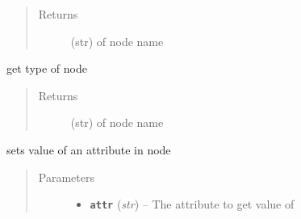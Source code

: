 \documentclass[letterpaper,10pt,english]{sphinxmanual}
\begin{document}
\begin{fulllineitems}
\begin{fulllineitems}
\begin{quote}
\begin{description}
\item[{Returns}] \leavevmode
(str) of node name

\end{description}\end{quote}

\end{fulllineitems}


\begin{fulllineitems}
\label{zBuilder.nodes:zBuilder.nodes.base.BaseNode.get_type}
get type of node
\begin{quote}\begin{description}
\item[{Returns}] \leavevmode
(str) of node name

\end{description}\end{quote}

\end{fulllineitems}


\begin{fulllineitems}
\label{zBuilder.nodes:zBuilder.nodes.base.BaseNode.print_}
\end{fulllineitems}


\begin{fulllineitems}
\label{zBuilder.nodes:zBuilder.nodes.base.BaseNode.set_association}
\end{fulllineitems}


\begin{fulllineitems}
\label{zBuilder.nodes:zBuilder.nodes.base.BaseNode.set_attr_key_value}
\end{fulllineitems}


\begin{fulllineitems}
\label{zBuilder.nodes:zBuilder.nodes.base.BaseNode.set_attr_value}
sets value of an attribute in node
\begin{quote}\begin{description}
\item[{Parameters}] \leavevmode\begin{itemize}
\item {} 
\textbf{\texttt{attr}} (\emph{str}) -- The attribute to get value of


\end{itemize}
\end{description}
\end{quote}
\end{fulllineitems}
\end{fulllineitems}
\end{document}
